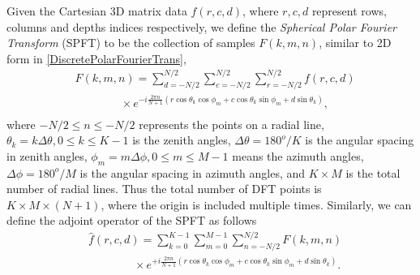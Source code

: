 \documentclass{UCF_ETD}
\begin{document}
 Given the Cartesian 3D matrix data $f(r,c,d)$, where $r,c,d$ represent rows, columns and depths indices respectively, we define the \emph{Spherical Polar Fourier Transform} (SPFT) to be the collection of samples $F(k,m,n)$, similar to 2D form in \eqref{DiscretePolarFourierTrans},
 \begin{eqnarray}\label{DiscreteSphericalFourierTrans}
 & F( k, m, n) = \sum\limits_{d=-N/2}^{N/2} \sum\limits_{c=-N/2}^{N/2}\sum\limits_{r= -N/2}^{N/2} f(r,c,d) \nonumber \\
 & \qquad \qquad \times e^{-i\frac{2\pi n}{N+1}(r \cos \theta_k \cos\phi_m + c \cos\theta_k \sin \phi_m + d \sin \theta_k)}, \nonumber \\
 \end{eqnarray}
 where $-N/2\leq n \leq -N/2$ represents the points on a radial line, $\theta_k = k\Delta \theta,0 \leq k \leq K-1$ is the {zenith} angles, $\Delta \theta = 180^o/K$ is the angular spacing in {zenith} angles, $\phi_m = m\Delta \phi,0 \leq m \leq M-1$ means the {azimuth} angles, $\Delta \phi = 180^o/M$ is the angular spacing in {azimuth} angles, and $K\times M$ is the total number of radial lines. Thus the total number of DFT points is $K \times M \times (N+1)$, where the origin is included multiple times. Similarly, we can define the adjoint operator of the SPFT as follows
 \begin{eqnarray}\label{AdjointDiscreteSphericalFourierTrans}
 & \hat{f}(r,c,d)  = \sum\limits_{k=0}^{K-1} \sum\limits_{m=0}^{M-1}\sum\limits_{n= -N/2}^{N/2} F( k, m, n) \nonumber \\
 & \qquad \qquad \times e^{+i\frac{2\pi n}{N+1}(r \cos \theta_k \cos\phi_m + c \cos\theta_k \sin \phi_m + d \sin \theta_k)}. \nonumber \\
 \end{eqnarray}
 
\end{document}
